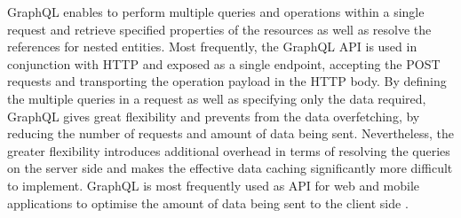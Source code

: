 GraphQL enables to perform multiple queries and operations within a single request and retrieve specified properties of the resources as well as resolve the references for nested entities. Most frequently, the GraphQL API is used in conjunction with HTTP and exposed as a single endpoint, accepting the POST requests and transporting the operation payload in the HTTP body. By defining the multiple queries in a request as well as specifying only the data required, GraphQL gives great flexibility and prevents from the data overfetching, by reducing the number of requests and amount of data being sent. Nevertheless, the greater flexibility introduces additional overhead in terms of resolving the queries on the server side and makes the effective data caching significantly more difficult to implement. GraphQL is most frequently used as API for web and mobile applications to optimise the amount of data being sent to the client side \cite{APIDesignInDistributedSystems}.




